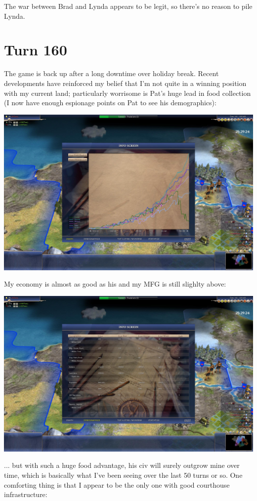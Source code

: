 \documentclass[10pt]{article}
\begin{document}
The war between Brad and Lynda appears to be legit, so there's no reason to pile Lynda.

\section*{Turn 160}

The game is back up after a long downtime over holiday break. Recent
developments have reinforced my belief that I'm not quite in a winning
position with my current land; particularly worrisome is Pat's huge
lead in food collection (I now have enough espionage points on Pat to
see his demographics):

\includegraphics[width=1.0\textwidth]{turn160-1}

My economy is almost as good as his and my MFG is still slighlty above:

\includegraphics[width=1.0\textwidth]{turn160-2}

... but with such a huge food advantage, his civ will surely outgrow
mine over time, which is basically what I've been seeing over the last
50 turns or so. One comforting thing is that I appear to be the only
one with good courthouse infrastructure:
\end{document}
